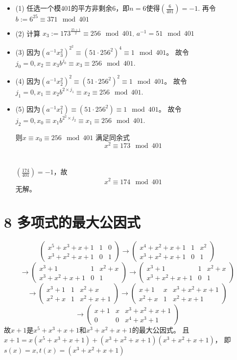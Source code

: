 \documentclass{article}
\begin{document}
\begin{itemize}
\item[] (1)
任选一个模401的平方非剩余6，即$n=6$使得$(\frac{6}{401})=-1$.
再令$b:=6^{25} \equiv 371 \mod 401$
\item[] (2)
计算 $x_3:=173^{\frac{25+1}{2}}\equiv 256 \mod 401$.
$a^{-1} = 51 \mod 401$
\item[] (3)
因为$(a^{-1}x_3^2)^{2^2}\equiv (51\cdot256^2)^4 \equiv 1 \mod 401$。
故令$j_0=0,x_2\equiv x_3b^{j_0}\equiv x_3\equiv 256 \mod 401$.
\item[] (4)
因为$(a^{-1}x_2^2)^{2}\equiv (51\cdot256^2)^2 \equiv 1 \mod 401$。
故令$j_1=0,x_1\equiv x_2b^{2\times{j_1}}\equiv x_2\equiv 256 \mod 401$.
\item[] (5)
因为$(a^{-1}x_1^2) \equiv (51\cdot256^2) \equiv 1 \mod 401$。
故令$j_2=0,x_0\equiv x_1b^{2^2\times{j_2}}\equiv x_1\equiv 256 \mod 401$.

则$x\equiv x_0 \equiv 256 \mod 401$ 满足同余式
$$x^2\equiv 173 \mod 401$$
\\\\
$(\frac{174}{401})=-1$，故
$$x^2\equiv 174 \mod 401$$
无解。
\end{itemize}

\section*{8 多项式的最大公因式}
$$
\left(
\begin{matrix}
x^5+x^3+x+1 & 1 & 0\\
x^3+x^2+x+1 & 0 & 1
\end{matrix}
\right)
\rightarrow 
\left(
\begin{matrix}
x^4+x^2+x+1 & 1 & x^2\\
x^3+x^2+x+1 & 0 & 1
\end{matrix}
\right)
$$
$$
\rightarrow 
\left(
\begin{matrix}
x^3+1 & 1 & x^2+x\\
x^3+x^2+x+1 & 0 & 1
\end{matrix}
\right)
\rightarrow 
\left(
\begin{matrix}
x^3+1 & 1 & x^2+x\\
x^3+x^2+x+1 & 0 & 1
\end{matrix}
\right)
$$
$$
\rightarrow 
\left(
\begin{matrix}
x^3+1 & 1 & x^2+x\\
x^2+x & 1 & x^2+x+1
\end{matrix}
\right)
\rightarrow 
\left(
\begin{matrix}
x+1 & x & x^3+x^2+x+1\\
x^2+x & 1 & x^2+x+1
\end{matrix}
\right)$$
$$
\rightarrow
\left(
\begin{matrix}
x+1 & x & x^3+x^2+x+1\\
0 & 0 & x^4+x^3+1
\end{matrix}
\right)
$$
故$x+1$是$x^5+x^3+x+1$和$x^3+x^2+x+1$的最大公因式。
且$x+1 = x(x^5+x^3+x+1) + (x^3+x^2+x+1)(x^3+x^2+x+1)$，
即$s(x) = x,	t(x) = (x^3+x^2+x+1)$
\clearpage
\end{document}
